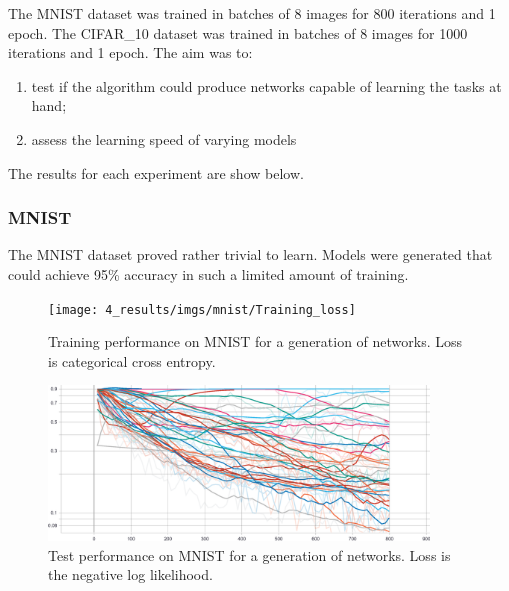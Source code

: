 The MNIST dataset was trained in batches of 8 images for 800 iterations and 1 epoch. The CIFAR\_10 dataset was trained in batches of 8 images for 1000 iterations and 1 epoch. The aim was to:

\begin{enumerate}
    \item test if the algorithm could produce networks capable of learning the tasks at hand;
    \item assess the learning speed of varying models
\end{enumerate}

The results for each experiment are show below.

            \subsubsection{MNIST}
            The MNIST dataset proved rather trivial to learn. Models were generated that could achieve 95\% accuracy in such a limited amount of training.
                \begin{figure}[h]
                        \centering
                        \label{fig:mnist_train}
                        \texttt{[image: 4\_results/imgs/mnist/Training\_loss]}
                    \caption{Training performance on MNIST for a generation of networks. Loss is categorical cross entropy.}
                \end{figure}


                \begin{figure}[h]
                        \centering
                        \label{fig:mnist_test}
                        \includegraphics[width=0.9\textwidth]{4_results/imgs/mnist/Test_loss}
                    \caption{Test performance on MNIST for a generation of networks. Loss is the negative log likelihood.}
                \end{figure}



